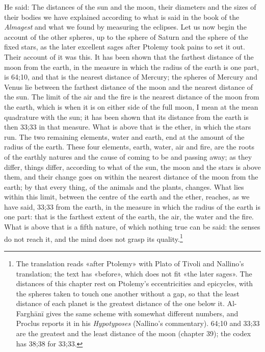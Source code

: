 \documentclass[11pt]{article}
\newcommand{\ArPage}[1]{\marginpar{\footnotesize\color{gray}Ar.\,p.\,#1}}
\begin{document}
\par \ArPage{182}He said: The distances of the sun and the moon, their diameters and the sizes of their bodies we have explained according to what is said in the book of the \emph{Almagest} and what we found by measuring the eclipses. Let us now begin the account of the other spheres, up to the sphere of Saturn and the sphere of the fixed stars, as the later excellent sages after Ptolemy took pains to set it out. Their account of it was this. It has been shown that the farthest distance of the moon from the earth, in the measure in which the radius of the earth is one part, is 64;10, and that is the nearest distance of Mercury; the spheres of Mercury and Venus lie between the farthest distance of the moon and the nearest distance of the sun. The limit of the air and the fire is the nearest distance of the moon from the earth, which is when it is on either side of the full moon, I mean at the mean quadrature with the sun; it has been shown that its distance from the earth is then 33;33 in that measure. What is above that is the ether, in which the stars run. The two remaining elements, water and earth, end at the amount of the radius of the earth. These four elements, earth, water, air and fire, are the roots of the earthly natures and the cause of coming to be and passing away; as they differ, things differ, according to what of the sun, the moon and the stars is above them, and their change goes on within the nearest distance of the moon from the earth; by that every thing, of the animals and the plants, changes. What lies within this limit, between the centre of the earth and the ether, reaches, as we have said, 33;33 from the earth, in the measure in which the radius of the earth is one part: that is the farthest extent of the earth, the air, the water and the fire. What is above that is a fifth nature, of which nothing true can be said: the senses do not reach it, and the mind does not grasp its quality.\footnote{The translation reads «after Ptolemy» with Plato of Tivoli and Nallino's translation; the text has «before», which does not fit «the later sages». The distances of this chapter rest on Ptolemy's eccentricities and epicycles, with the spheres taken to touch one another without a gap, so that the least distance of each planet is the greatest distance of the one below it. Al-Farghānī gives the same scheme with somewhat different numbers, and Proclus reports it in his \emph{Hypotyposes} (Nallino's commentary). 64;10 and 33;33 are the greatest and the least distance of the moon (chapter 39); the codex has 38;38 for 33;33.}\par
\end{document}
